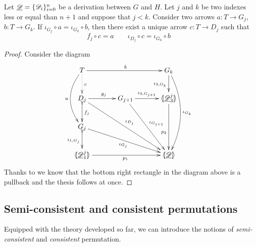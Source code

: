 \begin{corollary}\label{cor:ele}
	Let $\underline{\mathscr{D}}=\{\mathscr{D}_{i}\}_{i=0}^n$ be a derivation between $G$ and $H$. Let $j$ and $k$ be two indexes less or equal than $n+1$ and suppose that $j< k$.  Consider two arrows $a\colon T\to G_j$, $b\colon T\to G_k$. If $\iota_{G_j}\circ a = \iota_{G_k}\circ b$, 
	then  there exist a unique arrow $c\colon T\to D_j $  such that \[f_j\circ c = a\qquad \iota_{D_j}\circ c =\iota_{G_k}\circ b\]
	\end{corollary}
\begin{proof} Consider the diagram
			\[\xymatrix@C=34pt{T  \ar@/_.6cm/[dd]_{a}\ar@{.>}[d]^{c}\ar[rr]^{b}&& G_k \ar[d]_{\iota_{3, G_k}} \ar@/^.6cm/[ddd]^{\iota_{G_k}}\\D_{j} \ar[r]^{g_j} \ar[ddrr]^{\iota_{D_j}}\ar@{>->}[d]^{f_j}& G_{j+1} \ar[r]^-{\iota_{3,G_{j+1}}} \ar[ddr]^{\iota_{G_{j+1}}} & \lpro \der{D}^j_3\rpro \ar[dd]_(.6){p_2} \\ G_j \ar@{>->}[d]_{\iota_{1,G_j}} \ar[drr]_{\iota_{G_j}}\\ \lpro \der{D}^j_1 \rpro \ar[rr]_{p_1}  &&\tpro{D} }\] 
			Thanks to  we know that the bottom right rectangle in the diagram above is a pullback and the thesis follows at once.
\end{proof}	

\subsection{Semi-consistent and consistent permutations}
	
Equipped with the theory developed so far, we can introduce the notions of \emph{semi-consistent} and \emph{consistent} permutation.

